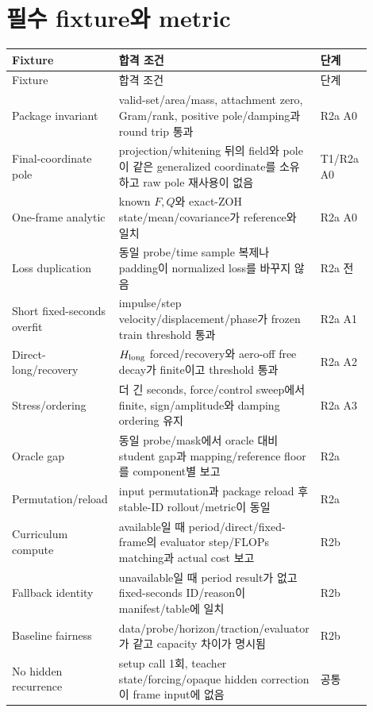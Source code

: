 \documentclass[10pt]{article}
\begin{document}
\section{필수 fixture와 metric}
\label{sec:r2-chapter-7}

\begin{longtable}{L{0.25\linewidth}L{0.49\linewidth}L{0.16\linewidth}}
\toprule
Fixture & 합격 조건 & 단계\\
\midrule
\endfirsthead
\toprule
Fixture & 합격 조건 & 단계\\
\midrule
\endhead
Package invariant & valid-set/area/mass, attachment zero, Gram/rank, positive pole/damping과 round trip 통과 & R2a A0\\
Final-coordinate pole & projection/whitening 뒤의 field와 pole이 같은 generalized coordinate를 소유하고 raw pole 재사용이 없음 & T1/R2a A0\\
One-frame analytic & known \(F,Q\)와 exact-ZOH state/mean/covariance가 reference와 일치 & R2a A0\\
Loss duplication & 동일 probe/time sample 복제나 padding이 normalized loss를 바꾸지 않음 & R2a 전\\
Short fixed-seconds overfit & impulse/step velocity/displacement/phase가 frozen train threshold 통과 & R2a A1\\
Direct-long/recovery & \(H_{\rm long}\) forced/recovery와 aero-off free decay가 finite이고 threshold 통과 & R2a A2\\
Stress/ordering & 더 긴 seconds, force/control sweep에서 finite, sign/amplitude와 damping ordering 유지 & R2a A3\\
Oracle gap & 동일 probe/mask에서 oracle 대비 student gap과 mapping/reference floor를 component별 보고 & R2a\\
Permutation/reload & input permutation과 package reload 후 stable-ID rollout/metric이 동일 & R2a\\
Curriculum compute & available일 때 period/direct/fixed-frame의 evaluator step/FLOPs matching과 actual cost 보고 & R2b\\
Fallback identity & unavailable일 때 period result가 없고 fixed-seconds ID/reason이 manifest/table에 일치 & R2b\\
Baseline fairness & data/probe/horizon/traction/evaluator가 같고 capacity 차이가 명시됨 & R2b\\
No hidden recurrence & setup call 1회, teacher state/forcing/opaque hidden correction이 frame input에 없음 & 공통\\
\bottomrule
\end{longtable}
\end{document}
